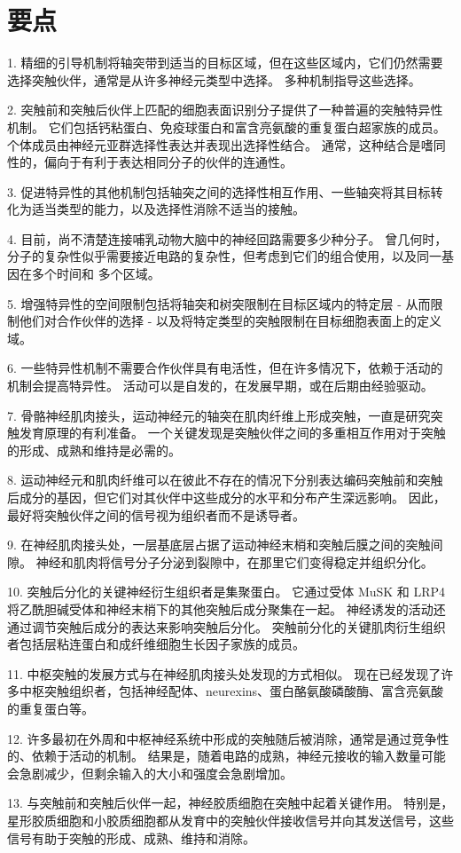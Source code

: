 \section{要点}

1. 精细的引导机制将轴突带到适当的目标区域，但在这些区域内，它们仍然需要选择突触伙伴，通常是从许多神经元类型中选择。 多种机制指导这些选择。 

2. 突触前和突触后伙伴上匹配的细胞表面识别分子提供了一种普遍的突触特异性机制。 它们包括钙粘蛋白、免疫球蛋白和富含亮氨酸的重复蛋白超家族的成员。 个体成员由神经元亚群选择性表达并表现出选择性结合。 通常，这种结合是嗜同性的，偏向于有利于表达相同分子的伙伴的连通性。 

3. 促进特异性的其他机制包括轴突之间的选择性相互作用、一些轴突将其目标转化为适当类型的能力，以及选择性消除不适当的接触。 

4. 目前，尚不清楚连接哺乳动物大脑中的神经回路需要多少种分子。 曾几何时，分子的复杂性似乎需要接近电路的复杂性，但考虑到它们的组合使用，以及同一基因在多个时间和 多个区域。

5. 增强特异性的空间限制包括将轴突和树突限制在目标区域内的特定层 - 从而限制他们对合作伙伴的选择 - 以及将特定类型的突触限制在目标细胞表面上的定义域。 

6. 一些特异性机制不需要合作伙伴具有电活性，但在许多情况下，依赖于活动的机制会提高特异性。 活动可以是自发的，在发展早期，或在后期由经验驱动。 

7. 骨骼神经肌肉接头，运动神经元的轴突在肌肉纤维上形成突触，一直是研究突触发育原理的有利准备。 一个关键发现是突触伙伴之间的多重相互作用对于突触的形成、成熟和维持是必需的。 

8. 运动神经元和肌肉纤维可以在彼此不存在的情况下分别表达编码突触前和突触后成分的基因，但它们对其伙伴中这些成分的水平和分布产生深远影响。 因此，最好将突触伙伴之间的信号视为组织者而不是诱导者。 

9. 在神经肌肉接头处，一层基底层占据了运动神经末梢和突触后膜之间的突触间隙。 神经和肌肉将信号分子分泌到裂隙中，在那里它们变得稳定并组织分化。 

10. 突触后分化的关键神经衍生组织者是集聚蛋白。 它通过受体 MuSK 和 LRP4 将乙酰胆碱受体和神经末梢下的其他突触后成分聚集在一起。 神经诱发的活动还通过调节突触后成分的表达来影响突触后分化。 突触前分化的关键肌肉衍生组织者包括层粘连蛋白和成纤维细胞生长因子家族的成员。 

11. 中枢突触的发展方式与在神经肌肉接头处发现的方式相似。 现在已经发现了许多中枢突触组织者，包括神经配体、neurexins、蛋白酪氨酸磷酸酶、富含亮氨酸的重复蛋白等。 

12. 许多最初在外周和中枢神经系统中形成的突触随后被消除，通常是通过竞争性的、依赖于活动的机制。 结果是，随着电路的成熟，神经元接收的输入数量可能会急剧减少，但剩余输入的大小和强度会急剧增加。 

13. 与突触前和突触后伙伴一起，神经胶质细胞在突触中起着关键作用。 特别是，星形胶质细胞和小胶质细胞都从发育中的突触伙伴接收信号并向其发送信号，这些信号有助于突触的形成、成熟、维持和消除。


